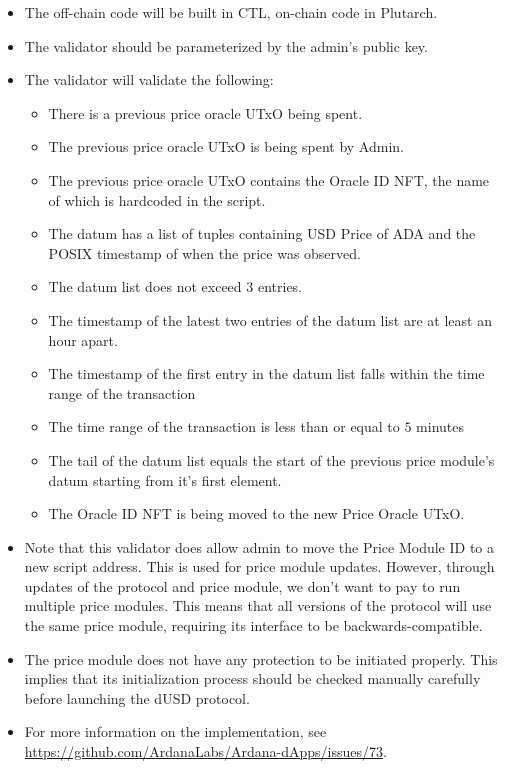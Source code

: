 \documentclass{article} %
\begin{document}
\begin{itemize}
  \item The off-chain code will be built in CTL, on-chain code in Plutarch.
  \item The validator should be parameterized by the admin's public key.
  \item The validator will validate the following:
    \begin{itemize}
      \item There is a previous price oracle UTxO being spent.
      \item The previous price oracle UTxO is being spent by Admin.
      \item The previous price oracle UTxO contains the Oracle ID NFT, the name
        of which is hardcoded in the script.
      \item The datum has a list of tuples containing USD Price of ADA and the
        POSIX timestamp of when the price was observed.
      \item The datum list does not exceed $3$ entries.
      \item The timestamp of the latest two entries of the datum list are at
        least an hour apart.
      \item The timestamp of the first entry in the datum list falls within the
        time range of the transaction
      \item The time range of the transaction is less than or equal to $5$
        minutes
      \item The tail of the datum list equals the start of the previous price
        module's datum starting from it's first element.
      \item The Oracle ID NFT is being moved to the new Price Oracle UTxO.
    \end{itemize}
  \item Note that this validator does allow admin to move the Price Module ID to
    a new script address. This is used for price module updates. However,
    through updates of the protocol and price module, we don't want to pay to
    run multiple price modules. This means that all versions of the protocol
    will use the same price module, requiring its interface to be
    backwards-compatible.
  \item The price module does not have any protection to be initiated properly.
    This implies that its initialization process should be checked manually
    carefully before launching the dUSD protocol.
  \item For more information on the implementation, see
    \url{https://github.com/ArdanaLabs/Ardana-dApps/issues/73}.
\end{itemize}
\end{document}
